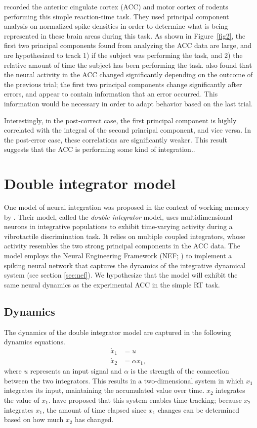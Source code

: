 \documentclass[11pt]{article}
\begin{document}
\citet{Narayanan2009} recorded
the anterior cingulate cortex (ACC) and motor cortex
of rodents performing this simple reaction-time task.
They used principal component analysis
on normalized spike densities
in order to determine
what is being represented in these brain areas
during this task.
As shown in Figure~\ref{fig2},
the first two principal components
found from analyzing the ACC data are large,
and are hypothesized to track
1) if the subject was performing the task, and
2) the relative amount of time the subject has been
performing the task.
\citeauthor{Narayanan2009} also found that the neural activity
in the ACC changed significantly depending on
the outcome of the previous trial;
the first two principal components
change significantly after errors,
and appear to contain information that an error occurred.
This information would be necessary
in order to adapt behavior based on the last trial.

Interestingly, in the post-correct case,
the first principal component
is highly correlated with the integral
of the second principal component,
and vice versa.
In the post-error case,
these correlations are significantly weaker.
This result suggests that
the ACC is performing some kind of integration..

\section{Double integrator model}

One model of neural integration
was proposed in the context of working memory
by \citet{Singh2006}.
Their model, called the \textit{double integrator} model,
uses multidimensional neurons
in integrative populations
to exhibit time-varying activity
during a vibrotactile discrimination task.
It relies on multiple coupled integrators,
whose activity resembles
the two strong principal components
in the ACC data.
The model employs
the Neural Engineering Framework (NEF; \citealp{Eliasmith2003})
to implement a spiking neural network
that captures the dynamics of the
integrative dynamical system
(see section \ref{sec:nef}).
We hypothesize that the \citeauthor{Singh2006} model
will exhibit the same neural dynamics
as the experimental ACC in the simple RT task.

\subsection{Dynamics}

The dynamics of the double integrator model
are captured in the following dynamics equations.
\begin{align*}
  \dot{x}_1 &= u \\
  \dot{x}_2 &= \alpha x_1,
\end{align*}
where $u$ represents an input signal
and $\alpha$ is the strength of
the connection between the two integrators.
This results in a two-dimensional system
in which $x_1$ integrates its input,
maintaining the accumulated value over time.
$x_2$ integrates the value of $x_1$.
\citet{Singh2006} have proposed that this system
enables time tracking;
because $x_2$ integrates $x_1$,
the amount of time elapsed since
$x_1$ changes can be determined
based on how much $x_2$ has changed.
\end{document}
